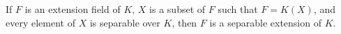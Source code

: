 If $F$ is an extension field of $K$, $X$ is a subset of $F$ such that $F = K(X)$, and every element of $X$ is separable over $K$, then $F$ is a separable extension of $K$.
